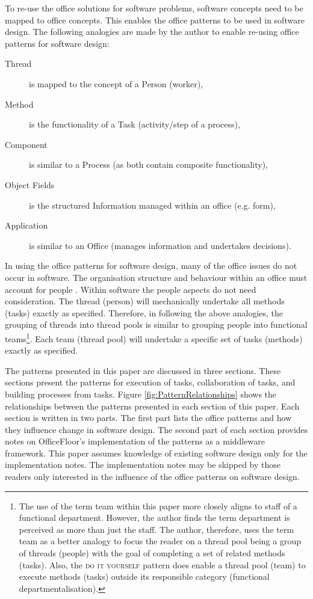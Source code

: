 \documentclass[prodmode]{style/acmlarge}
\begin{document}
To re-use the office solutions for software problems, software concepts need to
be mapped to office concepts.  This enables the office patterns to be used in
software design.  The following analogies are made by the author to enable
re-using office patterns for software design:
\begin{description}
  \item[Thread] is mapped to the concept of a Person (worker),
  \item[Method] is the functionality of a Task (activity/step of a process),
  \item[Component] is similar to a Process (as both contain composite functionality),
  \item[Object Fields] is the structured Information managed within an office (e.g. form),
  \item[Application] is similar to an Office (manages information and undertakes decisions).
\end{description}

In using the office patterns for software design, many of the office issues do
not occur in software.  The organisation structure and behaviour within an
office must account for people \cite{organisational-behaviour}.  Within software
the people aspects do not need consideration.  The thread (person) will
mechanically undertake all methods (tasks) exactly as specified.  Therefore, in
following the above analogies, the grouping of threads into thread pools is
similar to grouping people into functional teams\footnote{The use of the term
team within this paper more closely aligns to staff of a functional department.
However, the author finds the term department is perceived as more than just the
staff.  The author, therefore, uses the term team as a better analogy to focus
the reader on a thread pool being a group of threads (people) with the goal of
completing a set of related methods (tasks).  Also, the \textsc{do it yourself}
pattern does enable a thread pool (team) to execute methods (tasks) outside its
responsible category (functional departmentalisation).}.  Each team (thread
pool) will undertake a specific set of tasks (methods) exactly as specified.

The patterns presented in this paper are discussed in three sections.  These
sections present the patterns for execution of tasks, collaboration
of tasks, and building processes from tasks.  Figure
\ref{fig:PatternRelationships} shows the relationships between the patterns
presented in each section of this paper.  Each section is written in two parts.
The first part lists the office patterns and how they influence change in
software design.  The second part of each section provides notes on
OfficeFloor's implementation of the patterns as a middleware framework.  This
paper assumes knowledge of existing software design only for the implementation
notes.  The implementation notes may be skipped by those readers only interested
in the influence of the office patterns on software design.
\end{document}
